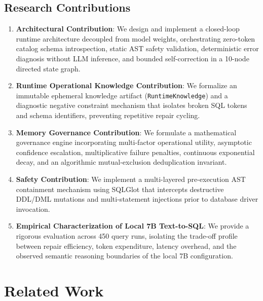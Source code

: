 \subsection{Research Contributions}
\begin{enumerate}
    \item \textbf{Architectural Contribution}: We design and implement a closed-loop runtime architecture decoupled from model weights, orchestrating zero-token catalog schema introspection, static AST safety validation, deterministic error diagnosis without LLM inference, and bounded self-correction in a 10-node directed state graph.
    \item \textbf{Runtime Operational Knowledge Contribution}: We formalize an immutable ephemeral knowledge artifact (\texttt{Runtime\-Knowledge}) and a diagnostic negative constraint mechanism that isolates broken SQL tokens and schema identifiers, preventing repetitive repair cycling.
    \item \textbf{Memory Governance Contribution}: We formulate a mathematical governance engine incorporating multi-factor operational utility, asymptotic confidence escalation, multiplicative failure penalties, continuous exponential decay, and an algorithmic mutual-exclusion deduplication invariant.
    \item \textbf{Safety Contribution}: We implement a multi-layered pre-execution AST containment mechanism using SQLGlot that intercepts destructive DDL/DML mutations and multi-statement injections prior to database driver invocation.
    \item \textbf{Empirical Characterization of Local 7B Text-to-SQL}: We provide a rigorous evaluation across 450 query runs, isolating the trade-off profile between repair efficiency, token expenditure, latency overhead, and the observed semantic reasoning boundaries of the local 7B configuration.
\end{enumerate}

\section{Related Work}

